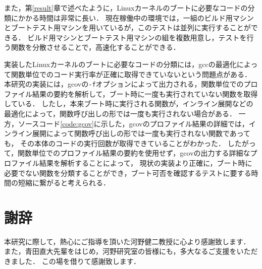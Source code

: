 \documentclass[graduation-thesis]{mlarticle}
\begin{document}
また，第\ref{result}章で述べたように，Linuxカーネルのブートに必要なコードの分類にかかる時間は非常に長い．
現在稼働中の環境では，一組のビルド用マシンとブートテスト用マシンを用いているが，このテストは並列に実行することができる．
ビルド用マシンとブートテスト用マシンの組を複数用意し，テストを行う関数を分散させることで，高速化することができる．

実装したLinuxカーネルのブートに必要なコードの分類には，gccの最適化によって関数単位でのコード実行率が正確に取得できていないという問題点がある．
本研究の実装には，gcovの\texttt{-f}オプションによって出力される，関数単位でのプロファイル結果の要約を解析して，ブート時に一度も実行されていない関数を取得している．
したし，本来ブート時に実行される関数が，インライン展開などの最適化によって，関数呼び出しの形では一度も実行されない場合がある．
一方，ソースコード\ref{code:gcov}に示した，gcovのプロファイル結果の詳細では，インライン展開によって関数呼び出しの形では一度も実行されない関数であっても，
その本体のコードの実行回数が取得できていることがわかった．
したがって，関数単位でのプロファイル結果の要約を使用せず，gcovの出力する詳細なプロファイル結果を解析することによって，
現状の実装より正確に，ブート時に必要でない関数を分類することができ，ブート可否を確認するテストに要する時間の短縮に繋がると考えられる．

\clearpage
\section{謝辞}
\label{sec-8}

本研究に際して，熱心にご指導を頂いた河野健二教授に心より感謝致します．
また，青田直大先輩をはじめ，河野研究室の皆様にも，多大なるご支援をいただきました．
この場を借りて感謝致します．

\clearpage



\end{document}
